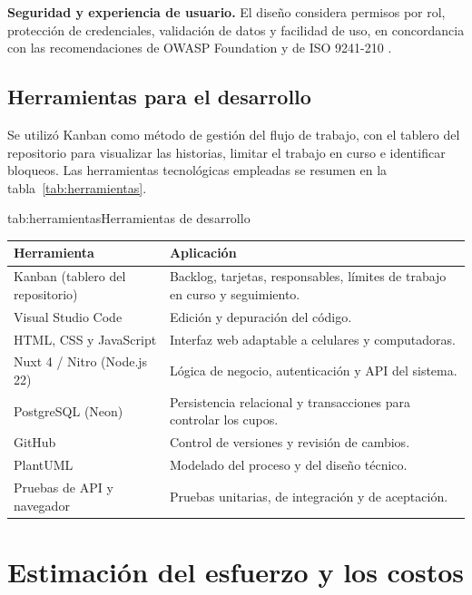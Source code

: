 \textbf{Seguridad y experiencia de usuario.} El diseño considera permisos por
rol, protección de credenciales, validación de datos y facilidad de uso, en
concordancia con las recomendaciones de OWASP Foundation
\parencite{owasp2025} y de ISO 9241-210 \parencite{iso9241}.

\subsection{Herramientas para el desarrollo}

Se utilizó Kanban como método de gestión del flujo de trabajo, con el tablero
del repositorio para visualizar las historias, limitar el trabajo en curso e
identificar bloqueos. Las herramientas tecnológicas empleadas se resumen en
la tabla~\ref{tab:herramientas}.

\begin{tablaapa}{tab:herramientas}{Herramientas de desarrollo}
\small
\begin{tabular}{@{}p{4.6cm}p{10.4cm}@{}}
\toprule
Herramienta & Aplicación \\
\midrule
Kanban (tablero del repositorio) & Backlog, tarjetas, responsables, límites
de trabajo en curso y seguimiento. \\
Visual Studio Code & Edición y depuración del código. \\
HTML, CSS y JavaScript & Interfaz web adaptable a celulares y
computadoras. \\
Nuxt 4 / Nitro (Node.js 22) & Lógica de negocio, autenticación y API del
sistema. \\
PostgreSQL (Neon) & Persistencia relacional y transacciones para controlar
los cupos. \\
GitHub & Control de versiones y revisión de cambios. \\
PlantUML & Modelado del proceso y del diseño técnico. \\
Pruebas de API y navegador & Pruebas unitarias, de integración y de
aceptación. \\
\bottomrule
\end{tabular}
\end{tablaapa}

\section{Estimación del esfuerzo y los costos}

